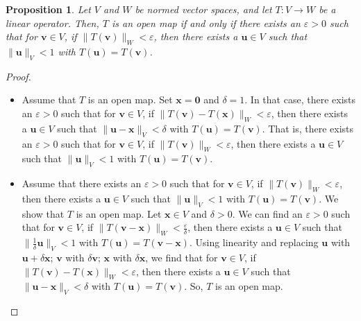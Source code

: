 \documentclass[a4paper, openany]{memoir}
\theoremstyle{definition}
\theoremstyle{plain}
\newtheorem{proposition}[definition]{Proposition}
\begin{document}
    \begin{proposition}
        Let $V$ and $W$ be normed vector spaces, and let $T: V \to W$ be a linear operator. Then, $T$ is an open map if and only if there exists an $\varepsilon > 0$ such that for $\bm{v} \in V$, if $\lVert T(\bm{v}) \rVert_W < \varepsilon$, then there exists a $\bm{u} \in V$ such that $\lVert \bm{u} \rVert_V < 1$ with $T(\bm{u}) = T(\bm{v})$.
    \end{proposition}
    \begin{proof}
        \hspace*{0pt}
        \begin{itemize}
            \item Assume that $T$ is an open map. Set $\bm{x} = \bm{0}$ and $\delta = 1$. In that case, there exists an $\varepsilon > 0$ such that for $\bm{v} \in V$, if $\lVert T(\bm{v}) - T(\bm{x}) \rVert_W < \varepsilon$, then there exists a $\bm{u} \in V$ such that $\lVert \bm{u} - \bm{x} \rVert_V < \delta$ with $T(\bm{u}) = T(\bm{v})$. That is, there exists an $\varepsilon > 0$ such that for $\bm{v} \in V$, if $\lVert T(\bm{v}) \rVert_W < \varepsilon$, then there exists a $\bm{u} \in V$ such that $\lVert \bm{u} \rVert_V < 1$ with $T(\bm{u}) = T(\bm{v})$.
            
            \item Assume that there exists an $\varepsilon > 0$ such that for $\bm{v} \in V$, if $\lVert T(\bm{v}) \rVert_W < \varepsilon$, then there exists a $\bm{u} \in V$ such that $\lVert \bm{u} \rVert_V < 1$ with $T(\bm{u}) = T(\bm{v})$. We show that $T$ is an open map. Let $\bm{x} \in V$ and $\delta > 0$. We can find an $\varepsilon > 0$ such that for $\bm{v} \in V$, if $\lVert T(\bm{v} - \bm{x}) \rVert_W < \frac{\varepsilon}{\delta}$, then there exists a $\bm{u} \in V$ such that $\lVert \frac{1}{\delta}\bm{u} \rVert_V < 1$ with $T(\bm{u}) = T(\bm{v} - \bm{x})$. Using linearity and replacing $\bm{u}$ with $\bm{u} + \delta\bm{x}$; $\bm{v}$ with $\delta \bm{v}$; $\bm{x}$ with $\delta \bm{x}$, we find that for $\bm{v} \in V$, if $\lVert T(\bm{v}) - T(\bm{x}) \rVert_W < \varepsilon$, then there exists a $\bm{u} \in V$ such that $\lVert \bm{u} - \bm{x} \rVert_V < \delta$ with $T(\bm{u}) = T(\bm{v})$. So, $T$ is an open map.
        \end{itemize}
    \end{proof}
\end{document}
